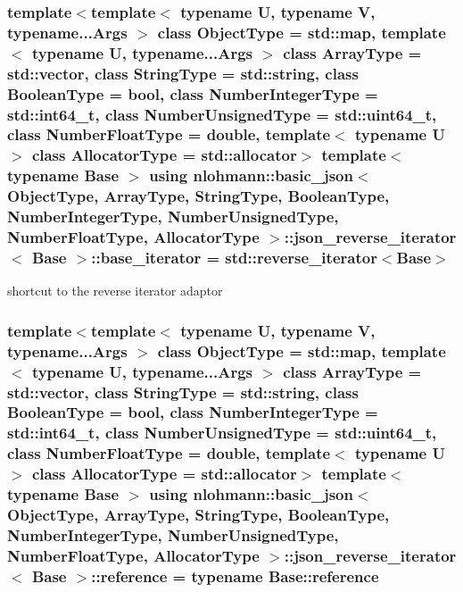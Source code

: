 \hypertarget{classnlohmann_1_1basic__json_1_1json__reverse__iterator_a9ebc4c99e6fc90c965af0f39ad2ca70e}{
\subsubsection[{base\-\_\-iterator}]{\setlength{\rightskip}{0pt plus 5cm}template$<$template$<$ typename U, typename V, typename...\-Args $>$ class Object\-Type = std\-::map, template$<$ typename U, typename...\-Args $>$ class Array\-Type = std\-::vector, class String\-Type  = std\-::string, class Boolean\-Type  = bool, class Number\-Integer\-Type  = std\-::int64\-\_\-t, class Number\-Unsigned\-Type  = std\-::uint64\-\_\-t, class Number\-Float\-Type  = double, template$<$ typename U $>$ class Allocator\-Type = std\-::allocator$>$ template$<$typename Base $>$ using {\bf nlohmann\-::basic\-\_\-json}$<$ Object\-Type, Array\-Type, String\-Type, Boolean\-Type, Number\-Integer\-Type, Number\-Unsigned\-Type, Number\-Float\-Type, Allocator\-Type $>$\-::{\bf json\-\_\-reverse\-\_\-iterator}$<$ Base $>$\-::{\bf base\-\_\-iterator} =  std\-::reverse\-\_\-iterator$<$Base$>$}}\label{classnlohmann_1_1basic__json_1_1json__reverse__iterator_a9ebc4c99e6fc90c965af0f39ad2ca70e}


shortcut to the reverse iterator adaptor 

\hypertarget{classnlohmann_1_1basic__json_1_1json__reverse__iterator_a7265535f39299824f9712a2ca15013c3}{
\subsubsection[{reference}]{\setlength{\rightskip}{0pt plus 5cm}template$<$template$<$ typename U, typename V, typename...\-Args $>$ class Object\-Type = std\-::map, template$<$ typename U, typename...\-Args $>$ class Array\-Type = std\-::vector, class String\-Type  = std\-::string, class Boolean\-Type  = bool, class Number\-Integer\-Type  = std\-::int64\-\_\-t, class Number\-Unsigned\-Type  = std\-::uint64\-\_\-t, class Number\-Float\-Type  = double, template$<$ typename U $>$ class Allocator\-Type = std\-::allocator$>$ template$<$typename Base $>$ using {\bf nlohmann\-::basic\-\_\-json}$<$ Object\-Type, Array\-Type, String\-Type, Boolean\-Type, Number\-Integer\-Type, Number\-Unsigned\-Type, Number\-Float\-Type, Allocator\-Type $>$\-::{\bf json\-\_\-reverse\-\_\-iterator}$<$ Base $>$\-::{\bf reference} =  typename Base\-::reference}}\label{classnlohmann_1_1basic__json_1_1json__reverse__iterator_a7265535f39299824f9712a2ca15013c3}



